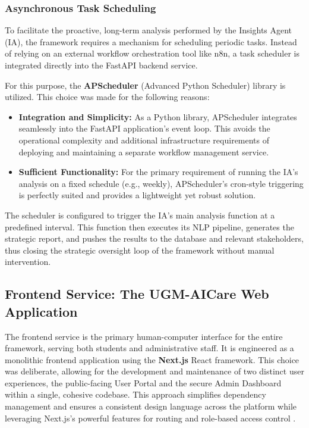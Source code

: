 \subsubsection{Asynchronous Task Scheduling}

To facilitate the proactive, long-term analysis performed by the Insights Agent (IA), the framework requires a mechanism for scheduling periodic tasks. Instead of relying on an external workflow orchestration tool like n8n, a task scheduler is integrated directly into the FastAPI backend service.

For this purpose, the \textbf{APScheduler} (Advanced Python Scheduler) library is utilized. This choice was made for the following reasons:
\begin{itemize}
    \item \textbf{Integration and Simplicity:} As a Python library, APScheduler integrates seamlessly into the FastAPI application's event loop. This avoids the operational complexity and additional infrastructure requirements of deploying and maintaining a separate workflow management service.
    \item \textbf{Sufficient Functionality:} For the primary requirement of running the IA's analysis on a fixed schedule (e.g., weekly), APScheduler's cron-style triggering is perfectly suited and provides a lightweight yet robust solution.
\end{itemize}
The scheduler is configured to trigger the IA's main analysis function at a predefined interval. This function then executes its NLP pipeline, generates the strategic report, and pushes the results to the database and relevant stakeholders, thus closing the strategic oversight loop of the framework without manual intervention.

\subsection{Frontend Service: The UGM-AICare Web Application}

The frontend service is the primary human-computer interface for the entire framework, serving both students and administrative staff. It is engineered as a monolithic frontend application using the \textbf{Next.js} React framework. This choice was deliberate, allowing for the development and maintenance of two distinct user experiences, the public-facing User Portal and the secure Admin Dashboard within a single, cohesive codebase. This approach simplifies dependency management and ensures a consistent design language across the platform while leveraging Next.js's powerful features for routing and role-based access control \cite{vercel2024nextjsdocs, granicz2022modernreact}.

